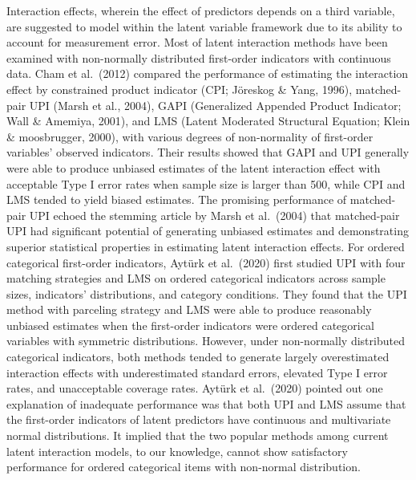 \documentclass[
  man]{apa7}
\begin{document}
Interaction effects, wherein the effect of predictors depends on a third variable, are suggested to model within the latent variable framework due to its ability to account for measurement error. Most of latent interaction methods have been examined with non-normally distributed first-order indicators with continuous data. Cham et al.~(2012) compared the performance of estimating the interaction effect by constrained product indicator (CPI; Jöreskog \& Yang, 1996), matched-pair UPI (Marsh et al., 2004), GAPI (Generalized Appended Product Indicator; Wall \& Amemiya, 2001), and LMS (Latent Moderated Structural Equation; Klein \& moosbrugger, 2000), with various degrees of non-normality of first-order variables' observed indicators. Their results showed that GAPI and UPI generally were able to produce unbiased estimates of the latent interaction effect with acceptable Type I error rates when sample size is larger than 500, while CPI and LMS tended to yield biased estimates. The promising performance of matched-pair UPI echoed the stemming article by Marsh et al.~(2004) that matched-pair UPI had significant potential of generating unbiased estimates and demonstrating superior statistical properties in estimating latent interaction effects. For ordered categorical first-order indicators, Aytürk et al.~(2020) first studied UPI with four matching strategies and LMS on ordered categorical indicators across sample sizes, indicators' distributions, and category conditions. They found that the UPI method with parceling strategy and LMS were able to produce reasonably unbiased estimates when the first-order indicators were ordered categorical variables with symmetric distributions. However, under non-normally distributed categorical indicators, both methods tended to generate largely overestimated interaction effects with underestimated standard errors, elevated Type I error rates, and unacceptable coverage rates. Aytürk et al.~(2020) pointed out one explanation of inadequate performance was that both UPI and LMS assume that the first-order indicators of latent predictors have continuous and multivariate normal distributions. It implied that the two popular methods among current latent interaction models, to our knowledge, cannot show satisfactory performance for ordered categorical items with non-normal distribution.
\end{document}
